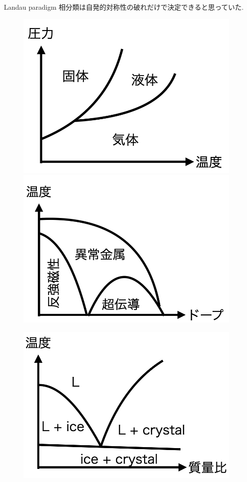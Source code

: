 \documentclass[dvipdfm]{beamer}
\begin{document}
\begin{frame}{Landau paradigm}
    相分類は自発的対称性の破れだけで決定できると思っていた. 
    \begin{figure}
        \centering
        \begin{minipage}{0.45\linewidth}
            \centering
            \includegraphics[width=0.8\linewidth]{phase3.png}
        \end{minipage}
        \begin{minipage}{0.45\linewidth}
            \centering
            \includegraphics[width=0.8\linewidth]{phase-mag.png}
        \end{minipage}
    \end{figure}
    \begin{figure}
        \centering
        \begin{minipage}{0.45\linewidth}
            \centering
            \includegraphics[width=0.8\linewidth]{melt.png}

\end{minipage}
\end{figure}
\end{frame}
\end{document}
